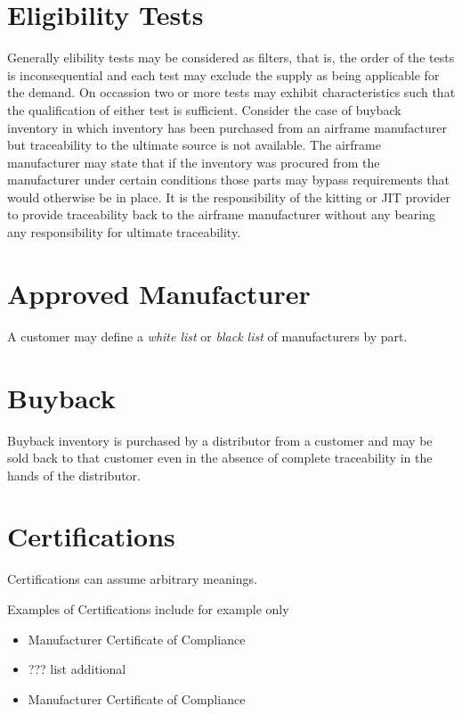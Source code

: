 \documentclass[letterpaper,10pt,english]{sphinxmanual}
\begin{document}
\section{Eligibility Tests}
\label{APS/ApsFeatures:id12}
Generally elibility tests may be considered as filters, that is, the
order of the tests is inconsequential and each test may exclude the
supply as being applicable for the demand. On occassion two or more
tests may exhibit characteristics such that the qualification of either
test is sufficient. Consider the case of buyback inventory in which
inventory has been purchased from an airframe manufacturer but
traceability to the ultimate source is not available. The airframe
manufacturer may state that if the inventory was procured from the
manufacturer under certain conditions those parts may bypass
requirements that would otherwise be in place. It is the responsibility
of the kitting or JIT provider to provide traceability back to the
airframe manufacturer without any bearing any responsibility for
ultimate traceability.


\section{Approved Manufacturer}
\label{APS/ApsFeatures:approved-manufacturer}
A customer may define a \emph{white list} or \emph{black list} of manufacturers by
part.


\section{Buyback}
\label{APS/ApsFeatures:buyback}
Buyback inventory is purchased by a distributor from a customer and may
be sold back to that customer even in the absence of complete
traceability in the hands of the distributor.


\section{Certifications}
\label{APS/ApsFeatures:id13}
Certifications can assume arbitrary meanings.

Examples of Certifications include for example only
\begin{itemize}
\item {} 
Manufacturer Certificate of Compliance

\item {} 
??? list additional

\item {} 
Manufacturer Certificate of Compliance

\end{itemize}
\end{document}
